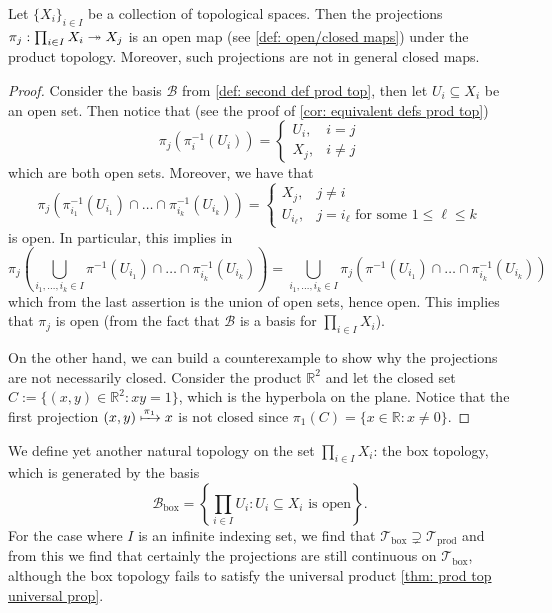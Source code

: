 \begin{lemma}
  Let \(\{X_i\}_{i \in I} \) be a collection of topological spaces. Then the
  projections \(\pi_j: \prod_{i \in I} X_i \twoheadrightarrow X_j\) is an open map (see
  \cref{def: open/closed maps}) under the product topology. Moreover, such
  projections are not in general closed maps.
\end{lemma}

\begin{proof}
  Consider the basis \(\mathcal B\) from \cref{def: second def prod top}, then
  let \(U_i \subseteq X_i\) be an open set. Then notice that (see the proof of
  \cref{cor: equivalent defs prod top})
  \[
    \pi_j(\pi_i^{-1}(U_i)) =
    \begin{cases}
      U_i, &i = j \\
      X_j, &i \neq j
    \end{cases}
  \]
  which are both open sets. Moreover, we have that
  \[
    \pi_j \left(\pi_{i_1}^{-1}(U_{i_1}) \cap \dots \cap \pi_{i_k}^{-1}(U_{i_k})
    \right) =
    \begin{cases}
      X_j,        & j \neq i \\
      U_{i_\ell}, & j = i_\ell \text{ for some } 1 \leq \ell \leq k
    \end{cases}
  \] 
  is open. In particular, this implies in
  \[
    \pi_j \left( \bigcup_{i_1, \dots, i_k \in I} \pi^{-1}(U_{i_1}) \cap \dots
    \cap \pi_{i_k}^{-1}(U_{i_k}) \right)
    = 
    \bigcup_{i_1, \dots, i_k \in I} \pi_j \left( \pi^{-1}(U_{i_1}) \cap \dots
    \cap \pi_{i_k}^{-1}(U_{i_k}) \right)
  \] 
  which from the last assertion is the union of open sets, hence open. This
  implies that \(\pi_j\) is open (from the fact that \(\mathcal B\) is a basis
  for \(\prod_{i \in I} X_i\)).

  On the other hand, we can build a counterexample to show why the projections
  are not necessarily closed. Consider the product \(\mathbb{R}^2\) and let the
  closed set \(C := \{(x, y) \in \mathbb{R}^2 : x y = 1\}\), which is the
  hyperbola on the plane. Notice that the first projection \((x, y)
  \xmapsto{\pi_1} x\) is not closed since \(\pi_1(C) = \{x \in \mathbb{R} : x
  \neq 0\}\).
\end{proof}

\begin{definition}
  We define yet another natural topology on the set \(\prod_{i \in I} X_i\): the
  box topology, which is generated by the basis 
  \[
    \mathcal B_\text{box} = \left\{\prod_{i \in I} U_i : U_i \subseteq X_i
    \text{ is open}\right\}.
  \] 
  For the case where \(I\) is an infinite indexing set, we find that \(\mathcal
  T_\text{box} \supsetneq \mathcal T_\text{prod}\) and from this we find that
  certainly the projections are still continuous on \(\mathcal T_\text{box}\),
  although the box topology fails to satisfy the universal product \cref{thm:
  prod top universal prop}.
\end{definition}


